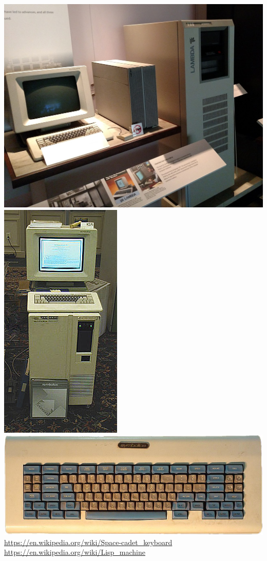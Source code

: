 \documentclass{beamer}
\begin{document}
\begin{frame}
	\includegraphics[scale=0.1]{bilder/lispm1.jpg}
	\includegraphics[scale=0.1]{bilder/symblics.jpeg}
	\includegraphics[scale=0.1]{bilder/space.jpg}
	\textmd{\url{https://en.wikipedia.org/wiki/Space-cadet_keyboard} \\ \url{https://en.wikipedia.org/wiki/Lisp_machine} }	
\end{frame}
\end{document}
